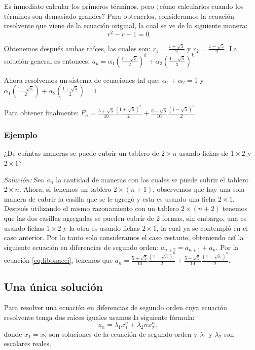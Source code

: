 \documentclass{article}
\begin{document}
Es inmediato calcular los primeros términos, pero ¿cómo calcularlos
cuando los términos son demasiado grandes?  Para obtenerlos,
consideramos la ecuación resolvente que viene de la ecuación original,
la cual se ve de la siguiente manera:
$$r^2-r-1=0$$

Obtenemos después ambas raíces, las cuales son:
$r_{1}= \frac{1+\sqrt{5}}{2}$ y $r_{2}=\frac{1-\sqrt{5}}{2}$. La
solución general es entonces:
$a_{k}=\alpha_{1}(\frac{1+\sqrt{5}}{2})^{k} +
\alpha_{2}(\frac{1-\sqrt{5}}{2})^k$

Ahora resolvemos un sistema de ecuaciones tal que:
$\alpha_{1} + \alpha_{2}= 1$ y
$\alpha_{1}(\frac{1+\sqrt{5}}{2}) + \alpha_{2}(\frac{1+\sqrt{5}}{2})=1$

Para obtener finalmente:
$F_{n}= \frac{5+\sqrt{5}}{10}\frac{(1+\sqrt{5})^n}{2} +
\frac{5-\sqrt{5}}{10}\frac{(1-\sqrt{5})^n}{2}$

\subsubsection{Ejemplo}
\label{sec:fichas}

¿De cuántas maneras se puede cubrir un tablero de $2\times n$ usando
fichas de $1\times 2$ y $2\times 1$?

\textit{Solución:} Sea $a_n$ la cantidad de maneras con las cuales se
puede cubrir el tablero $2\times n$. Ahora, si tenemos un tablero
$2\times (n+1)$, observemos que hay una sola manera de cubrir la
casilla que se le agregó y esta es usando una ficha $2\times 1$.
Después utilizando el mismo razonamiento con un tablero
$2\times (n+2)$ tenemos que las dos casillas agregadas se pueden
cubrir de 2 formas, sin embargo, una es usando fichas $1\times 2$ y la
otra es usando fichas $2\times 1$, la cual ya se contempló en el caso
anterior. Por lo tanto solo consideramos el caso restante, obteniendo
así la siguiente ecuación en diferencias de segundo orden:
$a_{n+2}=a_{n+1}+a_n$.  Por la ecuación \eqref{eq:fibonacci}, tenemos
que
$a_n=\frac{5+\sqrt{5}}{10}\frac{(1+\sqrt{5})^n}{2} +
\frac{5-\sqrt{5}}{10}\frac{(1-\sqrt{5})^n}{2}$.




\subsection{Una única solución}
\label{sec:unica}

Para resolver una ecuación en diferencias de segundo orden cuya
ecuación resolvente tenga dos raíces iguales usamos la siguiente fórmula:
\begin{equation}
 \label{raicesiguales}
 a_n=\lambda_1x_1^n +\lambda_2nx_2^n,
\end{equation}
donde $x_1=x_2$ son soluciones de la ecuación de segundo orden y
$\lambda_1$ y $\lambda_2$ son escalares reales.
\end{document}

